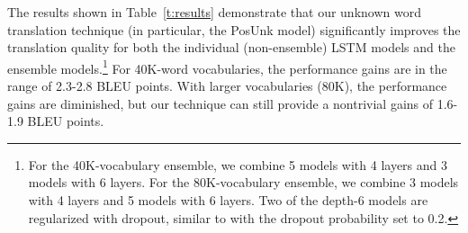 The results shown in Table~\ref{t:results} demonstrate that our unknown word translation technique (in particular, the PosUnk model) significantly improves the translation quality for both the individual (non-ensemble) LSTM models and the ensemble models.\footnote{
For the 40K-vocabulary ensemble, we combine 5 models with 4 layers and 3 models
with 6 layers. For the 80K-vocabulary ensemble, we combine 3 models with 4
layers and 5 models with 6 layers. Two of the depth-6 models are regularized
with dropout, similar to  with the dropout probability set to 0.2.} 
For 40K-word vocabularies, the performance gains are in the range of 2.3-2.8 BLEU points. With larger vocabularies (80K), the performance gains are diminished, but our technique can still provide a nontrivial gains of 1.6-1.9 BLEU points. 

